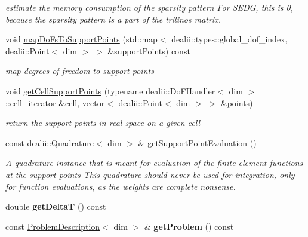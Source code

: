 \begin{DoxyCompactItemize}
\begin{DoxyCompactList}\small\item\em estimate the memory consumption of the sparsity pattern For SEDG, this is 0, because the sparsity pattern is a part of the trilinos matrix. \item\end{DoxyCompactList}\item 
void \hyperlink{classnatrium_1_1AdvectionOperator_a3de39c26aa52db4ced3d2d78e192ebce}{mapDoFsToSupportPoints} (std::map$<$ dealii::types::global\_\-dof\_\-index, dealii::Point$<$ dim $>$ $>$ \&supportPoints) const 
\begin{DoxyCompactList}\small\item\em map degrees of freedom to support points \item\end{DoxyCompactList}\item 
void \hyperlink{classnatrium_1_1AdvectionOperator_a6891816bbe0a3f6be217f47a78cdcd79}{getCellSupportPoints} (typename dealii::DoFHandler$<$ dim $>$::cell\_\-iterator \&cell, vector$<$ dealii::Point$<$ dim $>$ $>$ \&points)
\begin{DoxyCompactList}\small\item\em return the support points in real space on a given cell \item\end{DoxyCompactList}\item 
\hypertarget{classnatrium_1_1AdvectionOperator_af7e5dfef6d4e93a455b4eeb58cb543c2}{
const dealii::Quadrature$<$ dim $>$ \& \hyperlink{classnatrium_1_1AdvectionOperator_af7e5dfef6d4e93a455b4eeb58cb543c2}{getSupportPointEvaluation} ()}
\label{classnatrium_1_1AdvectionOperator_af7e5dfef6d4e93a455b4eeb58cb543c2}

\begin{DoxyCompactList}\small\item\em A quadrature instance that is meant for evaluation of the finite element functions at the support points This quadrature should never be used for integration, only for function evaluations, as the weights are complete nonsense. \item\end{DoxyCompactList}\item 
\hypertarget{classnatrium_1_1AdvectionOperator_a9c3f3aaea40cc82f345606291f9ac38d}{
double {\bfseries getDeltaT} () const }
\label{classnatrium_1_1AdvectionOperator_a9c3f3aaea40cc82f345606291f9ac38d}

\item 
\hypertarget{classnatrium_1_1AdvectionOperator_aa4610eea1853b4e9c2fe550527b4abcf}{
const \hyperlink{classnatrium_1_1ProblemDescription}{ProblemDescription}$<$ dim $>$ \& {\bfseries getProblem} () const }
\label{classnatrium_1_1AdvectionOperator_aa4610eea1853b4e9c2fe550527b4abcf}

\end{DoxyCompactItemize}
